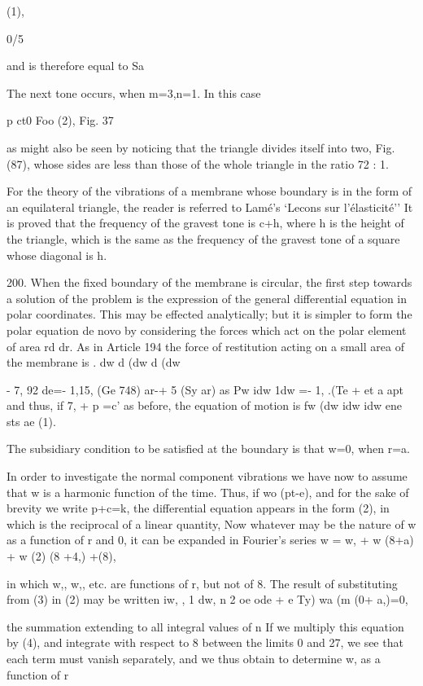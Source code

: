 (1),

0/5

and is therefore equal to Sa

The next tone occurs, when m=3,n=1. In this case

p ct0 Foo (2), Fig. 37

as might also be seen by noticing that the triangle divides itself into
two, Fig. (87), whose sides are less than those of the whole triangle in
the ratio 72 : 1.

For the theory of the vibrations of a membrane whose boundary is in the
form of an equilateral triangle, the reader is referred to Lamé's
`Lecons sur l'élasticité'' It is proved that the frequency of the
gravest tone is c+h, where h is the height of the triangle, which is the
same as the frequency of the gravest tone of a square whose diagonal is h.

200. When the fixed boundary of the membrane is circular, the first step
towards a solution of the problem is the expression of the general
differential equation in polar coordinates. This may be effected
analytically; but it is simpler to form the polar equation de novo by
considering the forces which act on the polar element of area rd dr. As
in Article 194 the force of restitution acting on a small area of the
membrane is . dw d (dw d (dw

- 7, 92 de=- 1,15, (Ge 748) ar-+ 5 (Sy ar) as Pw idw 1dw =- 1, .(Te + et
a apt and thus, if 7, + p =c' as before, the equation of motion is fw
(dw idw idw ene sts ae (1).

The subsidiary condition to be satisfied at the boundary is that w=0,
when r=a.

In order to investigate the normal component vibrations we have now to
assume that w is a harmonic function of the time. Thus, if wo (pt-e),
and for the sake of brevity we write p+c=k, the differential equation
appears in the form (2), in which is the reciprocal of a linear
quantity, Now whatever may be the nature of w as a function of r and 0,
it can be expanded in Fourier's series w = w, + w (8+a) + w (2) (8 +4,)
+(8),

in which w,, w,, etc. are functions of r, but not of 8. The result of
substituting from (3) in (2) may be written iw, , 1 dw, n 2 oe ode + e
Ty) wa (m (0+ a,)=0,

the summation extending to all integral values of n If we multiply this
equation by (4), and integrate with respect to 8 between the limits 0
and 27, we see that each term must vanish separately, and we thus obtain
to determine w, as a function of r

